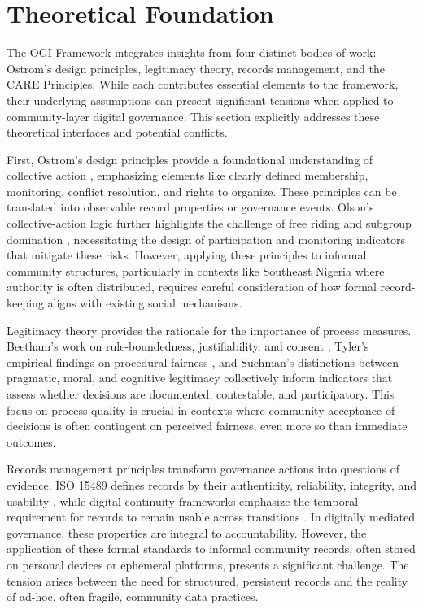 \documentclass[sigconf,anonymous]{acmart}
\begin{document}
\section{Theoretical Foundation}

The OGI Framework integrates insights from four distinct bodies of work: Ostrom’s design principles, legitimacy theory, records management, and the CARE Principles. While each contributes essential elements to the framework, their underlying assumptions can present significant tensions when applied to community-layer digital governance. This section explicitly addresses these theoretical interfaces and potential conflicts.

First, Ostrom’s design principles provide a foundational understanding of collective action \cite{ostrom1990}, emphasizing elements like clearly defined membership, monitoring, conflict resolution, and rights to organize. These principles can be translated into observable record properties or governance events. Olson’s collective-action logic further highlights the challenge of free riding and subgroup domination \cite{olson1965}, necessitating the design of participation and monitoring indicators that mitigate these risks. However, applying these principles to informal community structures, particularly in contexts like Southeast Nigeria where authority is often distributed, requires careful consideration of how formal record-keeping aligns with existing social mechanisms.

Legitimacy theory provides the rationale for the importance of process measures. Beetham’s work on rule-boundedness, justifiability, and consent \cite{beetham2013}, Tyler’s empirical findings on procedural fairness \cite{tyler2006}, and Suchman’s distinctions between pragmatic, moral, and cognitive legitimacy \cite{suchman1995} collectively inform indicators that assess whether decisions are documented, contestable, and participatory. This focus on process quality is crucial in contexts where community acceptance of decisions is often contingent on perceived fairness, even more so than immediate outcomes.

Records management principles transform governance actions into questions of evidence. ISO 15489 defines records by their authenticity, reliability, integrity, and usability \cite{iso2016}, while digital continuity frameworks emphasize the temporal requirement for records to remain usable across transitions \cite{lemieux2016}. In digitally mediated governance, these properties are integral to accountability. However, the application of these formal standards to informal community records, often stored on personal devices or ephemeral platforms, presents a significant challenge. The tension arises between the need for structured, persistent records and the reality of ad-hoc, often fragile, community data practices.
\end{document}
